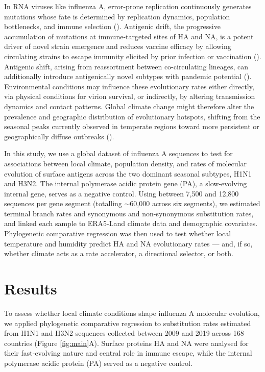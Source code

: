 \documentclass{pnas-new}
\begin{document}
In RNA viruses like influenza A, error-prone replication continuously generates mutations whose fate is determined by replication dynamics, population bottlenecks, and immune selection (\cite{nelson_evolution_2007, wille_ecology_2020}). Antigenic drift, the progressive accumulation of mutations at immune-targeted sites of HA and NA, is a potent driver of novel strain emergence and reduces vaccine efficacy by allowing circulating strains to escape immunity elicited by prior infection or vaccination (\cite{bedford_integrating_2014}). Antigenic shift, arising from reassortment between co-circulating lineages, can additionally introduce antigenically novel subtypes with pandemic potential (\cite{nelson_evolution_2007}). Environmental conditions may influence these evolutionary rates either directly, via physical conditions for virion survival, or indirectly, by altering transmission dynamics and contact patterns. Global climate change might therefore alter the prevalence and geographic distribution of evolutionary hotspots, shifting from the seasonal peaks currently observed in temperate regions toward more persistent or geographically diffuse outbreaks (\cite{baker_implications_2021}).

In this study, we use a global dataset of influenza A sequences to test for associations between local climate, population density, and rates of molecular evolution of surface antigens across the two dominant seasonal subtypes, H1N1 and H3N2. The internal polymerase acidic protein gene (PA), a slow-evolving internal gene, serves as a negative control. Using between 7,500 and 12,800 sequences per gene segment (totalling $\sim$60,000 across six segments), we estimated terminal branch rates and synonymous and non-synonymous substitution rates, and linked each sample to ERA5-Land climate data and demographic covariates. Phylogenetic comparative regression was then used to test whether local temperature and humidity predict HA and NA evolutionary rates — and, if so, whether climate acts as a rate accelerator, a directional selector, or both.

\section*{Results}

To assess whether local climate conditions shape influenza A molecular evolution, we applied phylogenetic comparative regression to substitution rates estimated from H1N1 and H3N2 sequences collected between 2009 and 2019 across 168 countries (Figure \ref{fig:main}A). Surface proteins HA and NA were analysed for their fast-evolving nature and central role in immune escape, while the internal polymerase acidic protein (PA) served as a negative control.
\end{document}
